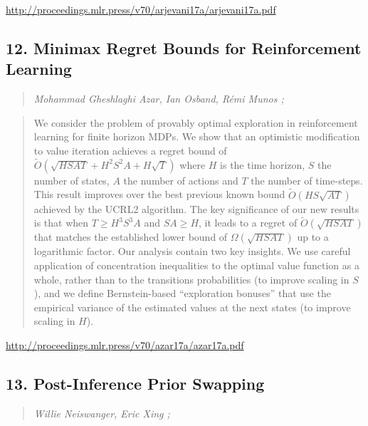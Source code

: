 \documentclass{article}
\begin{document}
\href{http://proceedings.mlr.press/v70/arjevani17a/arjevani17a.pdf}{http://proceedings.mlr.press/v70/arjevani17a/arjevani17a.pdf}

\subsection{12. Minimax Regret Bounds for Reinforcement Learning}

\begin{quote}
\footnotesize{\textit{Mohammad Gheshlaghi Azar, Ian Osband, Rémi Munos ;}}
\end{quote}

\begin{quote}
    We consider the problem of provably optimal exploration in reinforcement learning for finite horizon MDPs. We show that an optimistic modification to value iteration achieves a regret bound of $\tilde {O}( \sqrt{HSAT} + H^2S^2A+H\sqrt{T})$ where $H$ is the time horizon, $S$ the number of states, $A$ the number of actions and $T$ the number of time-steps. This result improves over the best previous known bound $\tilde {O}(HS \sqrt{AT})$ achieved by the UCRL2 algorithm. The key significance of our new results is that when $T\geq H^3S^3A$ and $SA\geq H$, it leads to a regret of $\tilde{O}(\sqrt{HSAT})$ that matches the established lower bound of $\Omega(\sqrt{HSAT})$ up to a logarithmic factor. Our analysis contain two key insights. We use careful application of concentration inequalities to the optimal value function as a whole, rather than to the transitions probabilities (to improve scaling in $S$), and we define Bernstein-based “exploration bonuses” that use the empirical variance of the estimated values at the next states (to improve scaling in $H$).  \end{quote}

\href{http://proceedings.mlr.press/v70/azar17a/azar17a.pdf}{http://proceedings.mlr.press/v70/azar17a/azar17a.pdf}

\subsection{13. Post-Inference Prior Swapping}

\begin{quote}
\footnotesize{\textit{Willie Neiswanger, Eric Xing ;}}
\end{quote}
\end{document}

